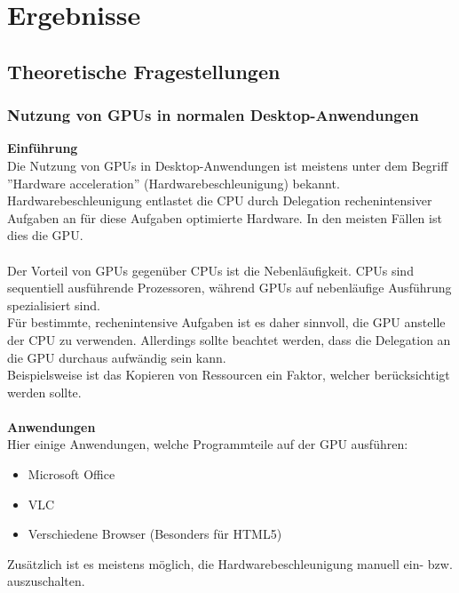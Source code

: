 
\section{Ergebnisse}
\label{sec:Ergebnisse}

\subsection{Theoretische Fragestellungen}
\subsubsection{Nutzung von GPUs in normalen Desktop-Anwendungen}
\textbf{Einführung}\\
Die Nutzung von GPUs in Desktop-Anwendungen ist meistens unter dem Begriff ''Hardware acceleration'' (Hardwarebeschleunigung) bekannt.\\
Hardwarebeschleunigung entlastet die CPU durch Delegation rechenintensiver Aufgaben an für diese Aufgaben optimierte Hardware. In den meisten Fällen ist dies die GPU. \cite{hardwareacc_streamingmedia} \\\\
Der Vorteil von GPUs gegenüber CPUs ist die Nebenläufigkeit. CPUs sind sequentiell ausführende Prozessoren, während GPUs auf nebenläufige Ausführung spezialisiert sind. \cite[S. 2-3]{programminggpgpu_kirk} \\
Für bestimmte, rechenintensive Aufgaben ist es daher sinnvoll, die GPU anstelle der CPU zu verwenden. Allerdings sollte beachtet werden, dass die Delegation an die GPU durchaus aufwändig sein kann.\\
Beispielsweise ist das Kopieren von Ressourcen ein Faktor, welcher berücksichtigt werden sollte.\\\\
\textbf{Anwendungen}\\
Hier einige Anwendungen, welche Programmteile auf der GPU ausführen:
\begin{itemize}
\item Microsoft Office
\item VLC
\item Verschiedene Browser (Besonders für HTML5)
\end{itemize}
Zusätzlich ist es meistens möglich, die Hardwarebeschleunigung manuell ein- bzw. auszuschalten.
\newpage
